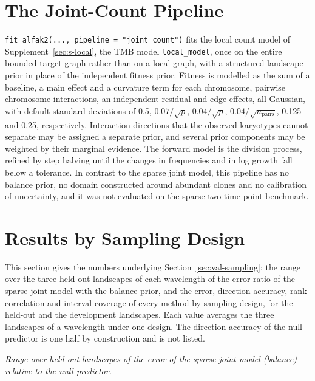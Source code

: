 \documentclass[11pt]{article}
\begin{document}
\section{The Joint-Count Pipeline}
\label{sec:s-joint-count}

\texttt{fit\_alfak2(..., pipeline = "joint\_count")} fits the local count
model of Supplement~\ref{sec:s-local}, the TMB model \texttt{local\_model},
once on the entire bounded target graph rather than on a local graph, with a
structured landscape prior in place of the independent fitness prior. Fitness
is modelled as the sum of a baseline, a main effect and a curvature term for
each chromosome, pairwise chromosome interactions, an independent residual and
edge effects, all Gaussian, with default standard deviations of 0.5,
$0.07/\sqrt p$, $0.04/\sqrt p$, $0.04/\sqrt{n_{\mathrm{pairs}}}$, 0.125 and
0.25, respectively. Interaction directions that the observed karyotypes cannot
separate may be assigned a separate prior, and several prior components may be
weighted by their marginal evidence. The forward model is the division
process, refined by step halving until the changes in frequencies and in log
growth fall below a tolerance. In contrast to the sparse joint model, this
pipeline has no balance prior, no domain constructed around abundant clones
and no calibration of uncertainty, and it was not evaluated on the sparse
two-time-point benchmark.

\section{Results by Sampling Design}
\label{sec:s-designs}

This section gives the numbers underlying Section~\ref{sec:val-sampling}: the
range over the three held-out landscapes of each wavelength of the error ratio
of the sparse joint model with the balance prior, and the error, direction
accuracy, rank correlation and interval coverage of every method by sampling
design, for the held-out and the development landscapes. Each value averages
the three landscapes of a wavelength under one design. The direction accuracy
of the null predictor is one half by construction and is not listed.

\noindent\textit{Range over held-out landscapes of the error of the sparse
joint model (balance) relative to the null predictor.}




\end{document}
